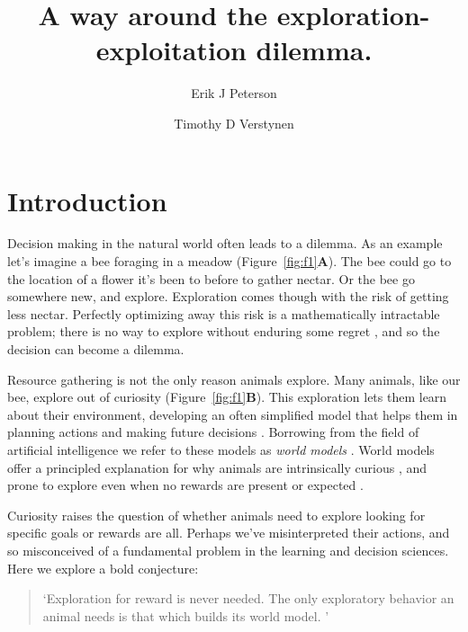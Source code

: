 \documentclass[9pt,twocolumn,twoside]{pnas-new}
\title{A way around the exploration-exploitation dilemma.}
\author[a,b,1]{Erik J Peterson}
\author[a,b,c,d]{Timothy D Verstynen}
\affil[a]{Department of Psychology}
\affil[b]{Center for the Neural Basis of Cognition}
\affil[c]{Carnegie Mellon Neuroscience Institute}
\affil[d]{Biomedical Engineering, Carnegie Mellon University, Pittsburgh PA}
\begin{document}
 
\verticaladjustment{-2pt} 
\maketitle

\thispagestyle{firststyle} 

\section*{Introduction}
Decision making in the natural world often leads to a dilemma. As an example let's imagine a bee foraging in a meadow (Figure~\ref{fig:f1}\textbf{A}). The bee could go to the location of a flower it's been to before to gather nectar. Or the bee go somewhere new, and explore. Exploration comes though with the risk of getting less nectar. Perfectly optimizing away this risk is a mathematically intractable problem; there is no way to explore without enduring some regret \cite{Thrun1992a,Dayan1996,Findling2018,Gershman2018b}, and so the decision can become a dilemma.

Resource gathering is not the only reason animals explore. Many animals, like our bee, explore out of curiosity (Figure~\ref{fig:f1}\textbf{B}). This exploration lets them learn about their environment, developing an often simplified model that helps them in planning actions and making future decisions \cite{Ahilan2019,Poucet1993}. Borrowing from the field of artificial intelligence we refer to these models as \textit{world models} \cite{`Schmidhuber2019,Sutton2018,Schmidhuber1991'}. World models offer a principled explanation for why animals are intrinsically curious \cite{Mehlhorn2015,Gupta2006,Berger-Tal2014,Gottlieb2018,Schwartenbeck2019,Pathak2017}, and prone to explore even when no rewards are present or expected \cite{Hughes1997}. 

Curiosity raises the question of whether animals need to explore looking for specific goals or rewards are all. Perhaps we've misinterpreted their actions, and so misconceived of a fundamental problem in the learning and decision sciences. Here we explore a bold conjecture:

\begin{quote}
`Exploration for reward is never needed. The only exploratory behavior an animal needs is that which builds its world model. '   
\end{quote}
\end{document}
